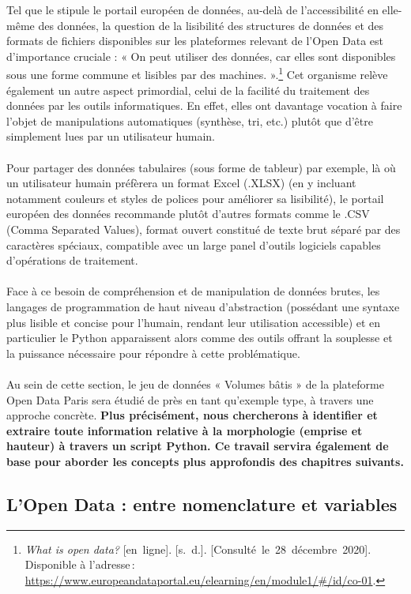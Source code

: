 \documentclass[
  11pt,
  french,
]{article}
\begin{document}
Tel que le stipule le portail européen de données, au-delà de
l'accessibilité en elle-même des données, la question de la lisibilité
des structures de données et des formats de fichiers disponibles sur les
plateformes relevant de l'Open Data est d'importance cruciale : « On
peut utiliser des données, car elles sont disponibles sous une forme
commune et lisibles par des machines. ».\footnote{\emph{What is open
  data?} {[}en~ligne{]}. {[}s.~d.{]}.
  {[}Consulté~le~28~décembre~2020{]}. Disponible à l'adresse\,:
  \url{https://www.europeandataportal.eu/elearning/en/module1/\#/id/co-01}.}
Cet organisme relève également un autre aspect primordial, celui de la
facilité du traitement des données par les outils informatiques. En
effet, elles ont davantage vocation à faire l'objet de manipulations
automatiques (synthèse, tri, etc.) plutôt que d'être simplement lues par
un utilisateur humain.\\
~\\
Pour partager des données tabulaires (sous forme de tableur) par
exemple, là où un utilisateur humain préfèrera un format Excel (.XLSX)
(en y incluant notamment couleurs et styles de polices pour améliorer sa
lisibilité), le portail européen des données recommande plutôt d'autres
formats comme le .CSV (Comma Separated Values), format ouvert constitué
de texte brut séparé par des caractères spéciaux, compatible avec un
large panel d'outils logiciels capables d'opérations de traitement.\\
~\\
Face à ce besoin de compréhension et de manipulation de données brutes,
les langages de programmation de haut niveau d'abstraction (possédant
une syntaxe plus lisible et concise pour l'humain, rendant leur
utilisation accessible) et en particulier le Python apparaissent alors
comme des outils offrant la souplesse et la puissance nécessaire pour
répondre à cette problématique.\\
~\\
Au sein de cette section, le jeu de données « Volumes bâtis » de la
plateforme Open Data Paris sera étudié de près en tant qu'exemple type,
à travers une approche concrète. \textbf{Plus précisément, nous
chercherons à identifier et extraire toute information relative à la
morphologie (emprise et hauteur) à travers un script Python. Ce travail
servira également de base pour aborder les concepts plus approfondis des
chapitres suivants.}

\newpage

\hypertarget{lopen-data-entre-nomenclature-et-variables}{%
\subsection{L'Open Data : entre nomenclature et
variables}\label{lopen-data-entre-nomenclature-et-variables}}
\end{document}

